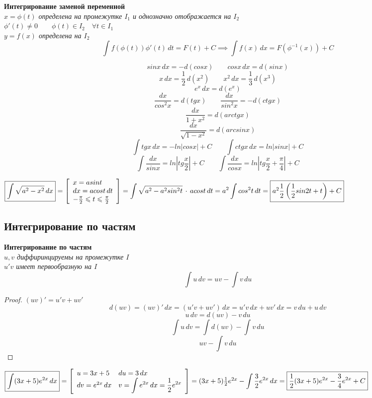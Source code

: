 \begin{theorem}
\textbf{Интегрирование заменой переменной} \\
\textit{
  $x = \phi(t)$ определена на промежутке $I_1$ и однозначно отображается на $I_2$ \\
  $\phi'(t) \neq 0 \qquad \phi(t) \in I_2 \quad \forall t \in I_1$ \\
  $y = f(x)$ определена на $I_2$
}
$$\int f(\phi(t))\phi'(t)\,dt = F(t) + C \implies \int f(x)\,dx = F(\phi^{-1}(x)) + C$$
\end{theorem}
\begin{corollary}
$$sinx\,dx = -d(cosx) \qquad cosx\,dx = d(sinx)$$
$$x\,dx = \frac{1}{2}\,d(x^2) \qquad x^2\,dx = \frac{1}{3}\,d(x^3)$$
$$e^x\,dx = d(e^x)$$
$$\frac{dx}{cos^2x} = d(tgx) \qquad \frac{dx}{sin^2x} = -d(ctgx)$$
$$\frac{dx}{1 + x^2} = d(arctgx)$$
$$\frac{dx}{\sqrt{1 - x^2}} = d(arcsinx)$$
$$\int tgx\,dx = -ln|cosx| + C \qquad \int ctgx\,dx = ln|sinx| + C$$
$$\int \frac{dx}{sinx} = ln\left|tg\frac{x}{2}\right| + C \qquad \int \frac{dx}{cosx} = ln\left|tg\frac{x}{2} + \frac{\pi}{4}\right| + C$$
\end{corollary}

\begin{eg}
$
  \fbox{$\displaystyle\int\sqrt{a^2 - x^2}\,dx$} = \left[
  \begin{array}{l}
  x = asint \\
  dx = acost\,dt \\
  -\frac{\pi}{2} \leqslant t \leqslant \frac{\pi}{2}
  \end{array}
  \right] = \displaystyle\int\sqrt{a^2 - a^2sin^2t}\,\cdot\,acost\,dt = a^2\int cos^2t\,dt = \fbox{$a^2\displaystyle\frac{1}{2}\left(\frac{1}{2}sin2t + t\right) + C$}
$
\end{eg}

\subsection{Интегрирование по частям}

\begin{theorem}
\textbf{Интегрирование по частям} \\
\textit{
  $u, v$ диффиринцируемы на промежутке $I$ \\
  $u'v$ имеет первообразную на $I$
}
$$\int u\,dv = uv - \int v\,du$$
\end{theorem}
\begin{proof}
$(uv)' = u'v + uv'$
$$d(uv) = (uv)'\,dx = (u'v + uv')\,dx = u'v\,dx + uv'\,dx = v\,du + u\,dv$$
$$u\,dv = d(uv) - v\,du$$
$$\int u\,dv = \int d(uv) - \int v\,du$$
$$uv - \int v\,du$$
\end{proof}

\begin{eg}
$
  \fbox{$\displaystyle\int(3x + 5)e^{2x}\,dx$} = \left[
  \begin{array}{ll}
  u = 3x + 5 & du = 3\,dx \\
  dv = e^{2x}\,dx & v = \displaystyle\int e^{2x}\,dx = \frac{1}{2}e^{2x}
  \end{array}
  \right] = (3x + 5)\frac{1}{2}e^{2x} - \displaystyle\int\frac{3}{2}e^{2x}\,dx = \fbox{$\displaystyle\frac{1}{2}(3x + 5)e^{2x} - \frac{3}{4}e^{2x} + C$}
$
\end{eg}
